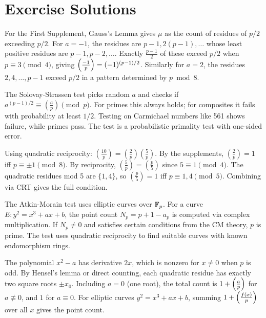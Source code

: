 \section{Exercise Solutions}

\begin{solution}
For the First Supplement, Gauss's Lemma gives $\mu$ as the count of residues of $p/2$ exceeding $p/2$. For $a = -1$, the residues are $p-1, 2(p-1), \ldots$ whose least positive residues are $p-1, p-2, \ldots$. Exactly $\frac{p-1}{2}$ of these exceed $p/2$ when $p \equiv 3 \pmod{4}$, giving $\left(\frac{-1}{p}\right) = (-1)^{(p-1)/2}$. Similarly for $a = 2$, the residues $2, 4, \ldots, p-1$ exceed $p/2$ in a pattern determined by $p \bmod 8$.
\end{solution}

\begin{solution}
The Solovay-Strassen test picks random $a$ and checks if $a^{(p-1)/2} \equiv \left(\frac{a}{p}\right) \pmod{p}$. For primes this always holds; for composites it fails with probability at least $1/2$. Testing on Carmichael numbers like 561 shows failure, while primes pass. The test is a probabilistic primality test with one-sided error.
\end{solution}

\begin{solution}
Using quadratic reciprocity: $\left(\frac{10}{p}\right) = \left(\frac{2}{p}\right)\left(\frac{5}{p}\right)$. By the supplements, $\left(\frac{2}{p}\right) = 1$ iff $p \equiv \pm 1 \pmod{8}$. By reciprocity, $\left(\frac{5}{p}\right) = \left(\frac{p}{5}\right)$ since $5 \equiv 1 \pmod{4}$. The quadratic residues mod 5 are $\{1, 4\}$, so $\left(\frac{p}{5}\right) = 1$ iff $p \equiv 1, 4 \pmod{5}$. Combining via CRT gives the full condition.
\end{solution}

\begin{solution}
The Atkin-Morain test uses elliptic curves over $\mathbb{F}_p$. For a curve $E: y^2 = x^3 + ax + b$, the point count $N_p = p + 1 - a_p$ is computed via complex multiplication. If $N_p \neq 0$ and satisfies certain conditions from the CM theory, $p$ is prime. The test uses quadratic reciprocity to find suitable curves with known endomorphism rings.
\end{solution}

\begin{solution}
The polynomial $x^2 - a$ has derivative $2x$, which is nonzero for $x \neq 0$ when $p$ is odd. By Hensel's lemma or direct counting, each quadratic residue has exactly two square roots $\pm x_0$. Including $a = 0$ (one root), the total count is $1 + \left(\frac{a}{p}\right)$ for $a \not\equiv 0$, and $1$ for $a \equiv 0$. For elliptic curves $y^2 = x^3 + ax + b$, summing $1 + \left(\frac{f(x)}{p}\right)$ over all $x$ gives the point count.
\end{solution}


